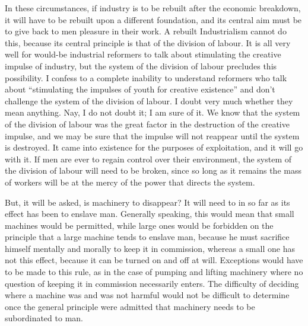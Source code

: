 \documentclass{book}
\begin{document}
In these circumstances, if industry is to be rebuilt after the economic breakdown, it will have to be rebuilt upon a different foundation, and its central aim must be to give back to men pleasure in their work. A rebuilt Industrialism cannot do this, because its central principle is that of the division of labour. It is all very well for would-be industrial reformers to talk about stimulating the creative impulse of industry, but the system of the division of labour precludes this possibility. I confess to a complete inability to understand reformers who talk about “stimulating the impulses of youth for creative existence” and don’t challenge the system of the division of labour. I doubt very much whether they mean anything. Nay, I do not doubt it; I am sure of it. We know that the system of the division of labour was the great factor in the destruction of the creative impulse, and we may be sure that the impulse will not reappear until the system is destroyed. It came into existence for the purposes of exploitation, and it will go with it. If men are ever to regain control over their environment, the system of the division of labour will need to be broken, since so long as it remains the mass of workers will be at the mercy of the power that directs the system.

But, it will be asked, is machinery to disappear? It will need to in so far as its effect has been to enslave man. Generally speaking, this would mean that small machines would be permitted, while large ones would be forbidden on the principle that a large machine tends to enslave man, because he must sacrifice himself mentally and morally to keep it in commission, whereas a small one has not this effect, because it can be turned on and off at will. Exceptions would have to be made to this rule, as in the case of pumping and lifting machinery where no question of keeping it in commission necessarily enters. The difficulty of deciding where a machine was and was not harmful would not be difficult to determine once the general principle were admitted that machinery needs to be subordinated to man.
\end{document}
